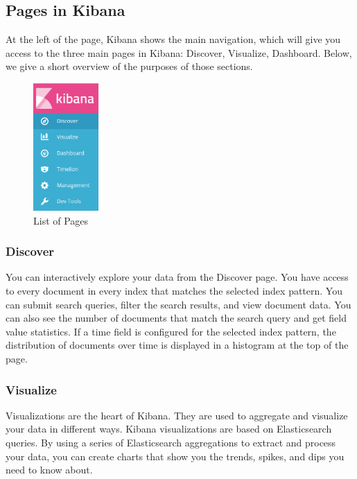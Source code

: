 \documentclass[a4paper, 12pt]{book}
\begin{document}
\subsection{Pages in Kibana}
At the left of the page, Kibana shows the main navigation, which will give you access to the three main pages in Kibana: Discover, Visualize, Dashboard. Below, we give a short overview of the purposes of those sections.


\begin{figure}[H]
  \centering
  \includegraphics[width=2.5cm, keepaspectratio]{img/context/PagesKibana}
  \caption{List of Pages}
  \label{fig:pageskibana}
\end{figure}

\subsubsection{Discover}
You can interactively explore your data from the Discover page. You have access to every document in every index that matches the selected index pattern. You can submit search queries, filter the search results, and view document data. You can also see the number of documents that match the search query and get field value statistics. If a time field is configured for the selected index pattern, the distribution of documents over time is displayed in a histogram at the top of the page.

\subsubsection{Visualize}
Visualizations are the heart of Kibana. They are used to aggregate and visualize your data in different ways. Kibana visualizations are based on Elasticsearch queries. By using a series of Elasticsearch aggregations to extract and process your data, you can create charts that show you the trends, spikes, and dips you need to know about.
\end{document}
